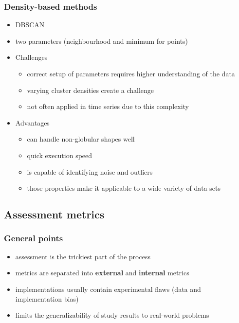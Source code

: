 \documentclass[11pt]{article}
\begin{document}
\subsubsection*{Density-based methods}
\label{sec:orgf60ddce}
\begin{itemize}
\item DBSCAN
\item two parameters (neighbourhood and minimum for points)
\end{itemize}
\begin{itemize}
\item Challenges
\label{sec:orga26ad2e}
\begin{itemize}
\item correct setup of parameters requires higher understanding of the data
\item varying cluster densities create a challenge
\item not often applied in time series due to this complexity
\end{itemize}
\item Advantages
\label{sec:org6e33770}
\begin{itemize}
\item can handle non-globular shapes well
\item quick execution speed
\item is capable of identifying noise and outliers
\item those properties make it applicable to a wide variety of data sets
\end{itemize}
\end{itemize}

\subsection*{Assessment metrics}
\label{sec:org6162d3c}
\subsubsection*{General points}
\label{sec:org25ed068}
\begin{itemize}
\item assessment is the trickiest part of the process
\item metrics are separated into \textbf{external} and \textbf{internal} metrics
\item implementations usually contain experimental flaws (data and implementation bias)
\item limits the generalizability of study results to real-world problems
\end{itemize}
\end{document}
